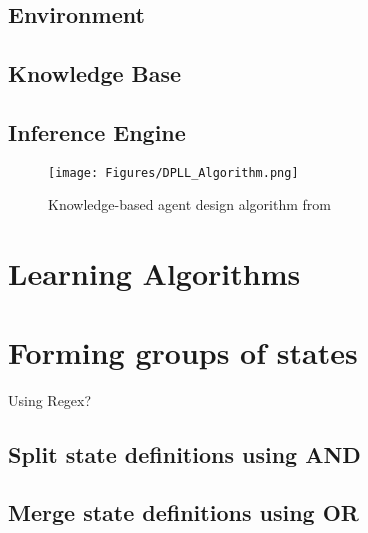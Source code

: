 \subsection{Environment}

\subsection{Knowledge Base}

\subsection{Inference Engine}

\begin{figure}[H]
    \centering
    \texttt{[image: Figures/DPLL\_Algorithm.png]}
    \caption{Knowledge-based agent design algorithm from \cite{russell2016artificial}}
    \label{fig:sysdiag}
\end{figure}



\section{Learning Algorithms} 

\section{Forming groups of states}
Using Regex?



\subsection{Split state definitions using AND}


\subsection{Merge state definitions using OR}
